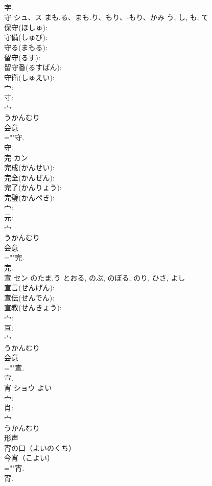\documentclass[8pt]{extreport}
\begin{document}
\begin{CJK}{UTF8}{min}
\\	字.
\\	守	シュ、ス	まも.る、まも.り、もり、-もり、かみ	う, し, も, て	
\\	保守(ほしゅ): 
\\	守備(しゅび): 
\\	守る(まもる): 
\\	留守(るす): 
\\	留守番(るすばん): 
\\	守衛(しゅえい): 
\\	宀: 
\\	寸: 
\\	宀	
\\	うかんむり	
\\	会意 
\\	=""守.
\\	守.
\\	完	カン			
\\	完成(かんせい): 
\\	完全(かんぜん): 
\\	完了(かんりょう): 
\\	完璧(かんぺき): 
\\	宀: 
\\	元: 
\\	宀	
\\	うかんむり	
\\	会意 
\\	=""完.
\\	完.
\\	宣	セン	のたま.う	とおる, のぶ, のぼる, のり, ひさ, よし	
\\	宣言(せんげん): 
\\	宣伝(せんでん): 
\\	宣教(せんきょう): 
\\	宀: 
\\	亘: 
\\	宀	
\\	うかんむり	
\\	会意 
\\	=""宣.
\\	宣.
\\	宵	ショウ	よい		
\\	宀: 
\\	肖: 
\\	宀	
\\	うかんむり	
\\	形声 
\\	宵の口（よいのくち）
\\	今宵（こよい）
\\	=""宵.
\\	宵.

\end{CJK}
\end{document}
